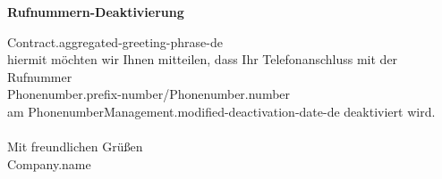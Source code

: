 \opening{\textbf{\Large{{Rufnummern-Deaktivierung}}}}

{{Contract.aggregated-greeting-phrase-de}}\\

hiermit möchten wir Ihnen mitteilen, dass Ihr Telefonanschluss mit der Rufnummer\\

{{Phonenumber.prefix-number}}/{{Phonenumber.number}}\\

am {{PhonenumberManagement.modified-deactivation-date-de}} deaktiviert wird.\\

~\\
Mit freundlichen Grüßen\\

{{Company.name}}

